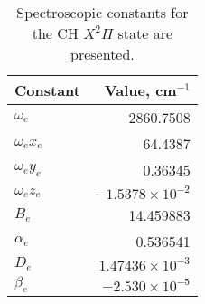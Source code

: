 \begin{table}
  \caption[Spectroscopic constants for the CH \(X^2\Pi\) state]{Spectroscopic constants for the CH \(X^2\Pi\) state are presented.}
  \begin{center}
    \begin{tabular}{lr}
      Constant & Value, cm\(^{-1}\) \tabularnewline
      \hline\hline
      \(\omega_e\) & 2860.7508 \tabularnewline
      \(\omega_ex_e\) & 64.4387 \tabularnewline
      \(\omega_ey_e\) & 0.36345 \tabularnewline
      \(\omega_ez_e\) & \(-1.5378 \times 10^{-2}\) \tabularnewline
      \(B_e\) & 14.459883 \tabularnewline
      \(\alpha_e\) & 0.536541 \tabularnewline
      \(D_e\) & \(1.47436 \times 10^{-3}\) \tabularnewline
      \(\beta_e\) & \(-2.530 \times 10^{-5}\) \tabularnewline
      \hline
    \end{tabular}
  \end{center}
  \label{tab:spectroscopicConstants}
\end{table}

